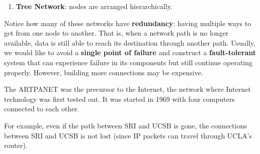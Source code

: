 \documentclass[a4paper, 12pt]{report}
\theoremstyle{remark}
\theoremstyle{definition}
\begin{document}
\begin{enumerate}
    \item \textbf{Tree Network}: nodes are arranged hierarchically.
\begin{center}
\end{center}
\end{enumerate}

Notice how many of these networks have \textbf{redundancy}: having multiple ways to get from one node to another. That is, when a network path is no longer available, data is still able to reach its destination through another path. Usually, we would like to avoid a \textbf{single point of failure} and construct a \textbf{fault-tolerant} system that can experience failure in its components but still continue operating properly. However, building more connections may be expensive. 

\begin{example}
The ARTPANET was the precursor to the Internet, the network where Internet technology was first tested out. It was started in 1969 with four computers connected to each other. 
\begin{center}
\end{center}
For example, even if the path between SRI and UCSB is gone, the connections between SRI and UCSB is not lost (since IP packets can travel through UCLA's router). 
\end{example}
\end{document}

